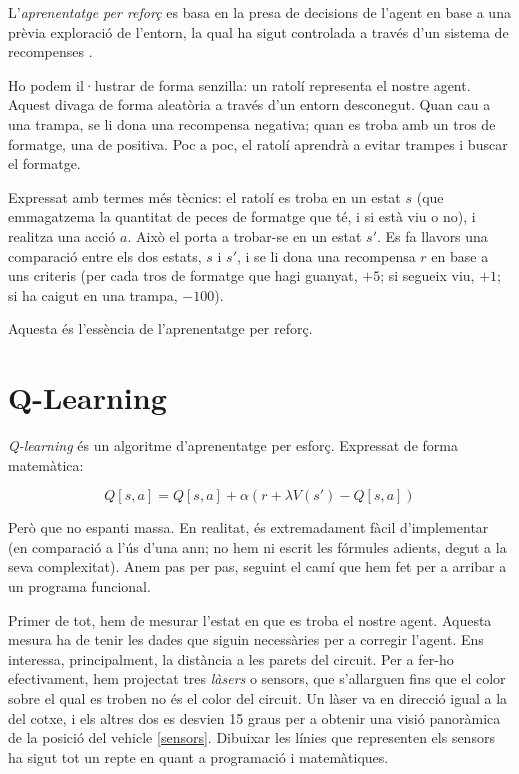 L'\emph{aprenentatge per reforç} es basa en la presa de decisions de l'agent en base
a una prèvia exploració de l'entorn, la qual ha sigut controlada a través d'un sistema
de recompenses \cite{reinflnbk}.

Ho podem il·lustrar de forma senzilla: un ratolí representa el nostre agent. Aquest divaga
de forma aleatòria a través d'un entorn desconegut. Quan cau a una trampa, se li dona una
recompensa negativa; quan es troba amb un tros de formatge, una de positiva. Poc a poc,
el ratolí aprendrà a evitar trampes i buscar el formatge.

Expressat amb termes més tècnics: el ratolí es troba en un estat \(s\) (que
emmagatzema la quantitat de peces de formatge que té, i si està viu o no), i
realitza una acció \(a\). Això el porta a trobar-se en un estat \(s'\).
Es fa llavors una comparació entre els dos estats, \(s\) i \(s'\), i se
li dona una recompensa \(r\) en base a uns criteris (per cada tros de formatge
que hagi guanyat, \(+5\); si segueix viu, \(+1\); si ha caigut en una trampa,
\(-100\)).

Aquesta és l'essència
de l'aprenentatge per reforç.

\section{Q-Learning}

\emph{Q-learning} és un algoritme d'aprenentatge per esforç. Expressat de forma
matemàtica:

\[
Q[s, a] = Q[s, a] + \alpha(r + \lambda V(s') - Q[s, a])
\]

Però que no espanti massa. En realitat, és extremadament fàcil d'implementar (en 
comparació a l'ús d'una \ac{ann}; no hem ni escrit les fórmules adients, degut a la seva
complexitat). Anem pas per pas, seguint el camí que hem fet per a arribar a 
un programa funcional.

Primer de tot, hem de mesurar l'estat en que es troba el nostre agent. Aquesta mesura ha de tenir les dades
que siguin necessàries per a corregir l'agent. Ens interessa, principalment, la distància
a les parets del circuit. Per a fer-ho efectivament, hem projectat tres \emph{làsers} o
sensors, que s'allarguen fins que el color sobre el qual es troben no és el color del circuit.
Un làser va en direcció igual a la del cotxe, i els altres dos es desvien 15 graus per a obtenir
una visió panoràmica de la posició del vehicle \ref{sensors}. Dibuixar les línies que
representen els sensors ha sigut tot un repte en quant a programació i matemàtiques.

